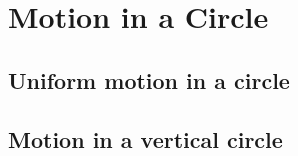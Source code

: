 \chapter{Motion in a Circle}

\section{Uniform motion in a circle}
\section{Motion in a vertical circle}
